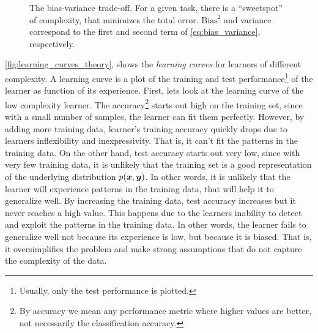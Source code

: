 \begin{figure}
	\centering
	\caption[The bias-variance trade-off.]{The bias-variance
	trade-off. For a given task,
	there is a ``sweetspot'' of complexity, that minimizes the total error.
	$\text{Bias}^2$ and variance correspond to the first and second term of
	\Equation{} \ref{eq:bias_variance}, respectively.}
	\label{fig:bias_variance}
\end{figure}

\Figure{} \ref{fig:learning_curves_theory}, shows the \emph{learning
curves} for learners of different complexity. A learning
curve is a plot of the training and test performance\footnote{Usually, only the test performance
is plotted.} of the learner as function of its experience.
First, lets look at the learning curve of the low complexity learner. The
accuracy\footnote{By accuracy we mean any performance metric where higher values are better, not necessarily the classification
accuracy.} starts out high on the training
set, since with a small number of samples, the learner can
fit them perfectly. However, by adding more training data, learner's training
accuracy quickly drops due to learners inflexibility
and inexpressivity. That is, it can't fit the patterns in the training data. On
the other hand, test accuracy starts out very low, since
with very few training data, it is unlikely that the training set is a good
representation of the underlying distribution $p(\boldsymbol{x},
\boldsymbol{y})$. In other words, it is unlikely that the learner will experience patterns
in the training data, that will help it to generalize well. By increasing the
training data, test accuracy increases but it never reaches a high value. This
happens due to the learners inability to detect and exploit the patterns in the
training data.  In other words, the learner fails to generalize well not because
its experience is low, but because it is biased. That is, it oversimplifies the
problem and make strong assumptions that do not capture the complexity of the
data.

